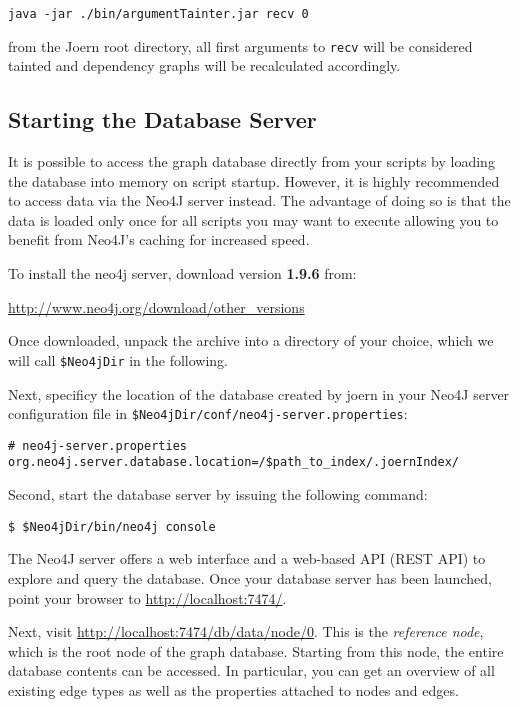\documentclass[a4paper]{article}
\newcommand{\code}[1]{\texttt{\small #1}}
\begin{document}
\begin{verbatim}
java -jar ./bin/argumentTainter.jar recv 0
\end{verbatim}

from the Joern root directory, all first arguments to \code{recv} will
be considered tainted and dependency graphs will be recalculated
accordingly.

\subsection{Starting the Database Server}

It is possible to access the graph database directly from your scripts
by loading the database into memory on script startup. However, it is
highly recommended to access data via the Neo4J server instead. The
advantage of doing so is that the data is loaded only once for all
scripts you may want to execute allowing you to benefit from Neo4J's
caching for increased speed.

To install the neo4j server, download version \textbf{1.9.6} from:

\href{http://www.neo4j.org/download/other\_versions}{http://www.neo4j.org/download/other\_versions}

Once downloaded, unpack the archive into a directory of your choice,
which we will call \code{\$Neo4jDir} in the following.

Next, specificy the location of the database created by joern in your
Neo4J server configuration file in
\code{\$Neo4jDir/conf/neo4j-server.properties}:

\begin{verbatim}
# neo4j-server.properties
org.neo4j.server.database.location=/$path_to_index/.joernIndex/
\end{verbatim}

Second, start the database server by issuing the following command:

\begin{verbatim}
$ $Neo4jDir/bin/neo4j console
\end{verbatim}
	
The Neo4J server offers a web interface and a web-based API (REST API)
to explore and query the database. Once your database server has been
launched, point your browser to
\href{http://localhost:7474/}{http://localhost:7474/}. 

Next, visit
\href{http://localhost:7474/db/data/node/0}{http://localhost:7474/db/data/node/0}. This
is the \emph{reference node}, which is the root node of the graph
database. Starting from this node, the entire database contents can be
accessed. In particular, you can get an overview of all existing edge
types as well as the properties attached to nodes and edges.
\end{document}
